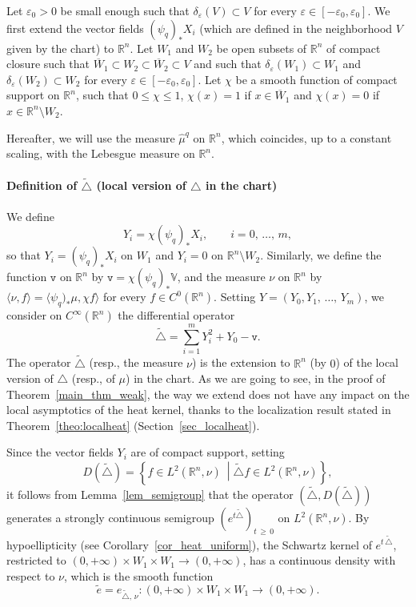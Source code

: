 \documentclass[AHL,Unicode,published]{cedram}
\newcommand*\R{\mathbb{R}}
\newcommand{\bbV}{\mathbb{V}}
\newcommand{\ttv}{\mathtt{v}}
\renewcommand{\geq}{\geqslant}
\renewcommand{\leq}{\leqslant}
\begin{document}
Let $\varepsilon_0>0$ be small enough such that $\delta_\varepsilon(V)\subset V$ for every $\varepsilon\in[-\varepsilon_0,\varepsilon_0]$. We first extend the vector fields $(\psi_{q})_*X_i$ (which are defined in the neighborhood $V$ given by the chart) to $\R^n$. Let $W_1$ and $W_2$ be open subsets of $\R^n$ of compact closure such that $\overline W_1\subset W_2\subset\overline W_2\subset V$ and such that $\delta_\varepsilon(W_1)\subset W_1$ and $\delta_\varepsilon(W_2)\subset W_2$ for every $\varepsilon\in[-\varepsilon_0,\varepsilon_0]$. Let $\chi$ be a smooth function of compact support on $\R^n$, such that $0\leq\chi\leq 1$, $\chi(x)=1$ if $x\in \overline W_1$ and $\chi(x)=0$ if $x\in\R^n\setminus W_2$.

Hereafter, we will use the measure $\widehat{\mu}^{q}$ on $\R^n$, which coincides, up to a constant scaling, with the Lebesgue measure on $\R^n$.


\goodbreak
\paragraph{Definition of $\widetilde\triangle$ (local version of $\triangle$ in the chart)}
We define
\[
Y_i = \chi (\psi_{q})_* X_i, \qquad i=0,\,\ldots,\,m,
\]
so that $Y_i = (\psi_{q})_* X_i$ on $W_1$ and $Y_i = 0$ on $\R^n\setminus W_2$. Similarly, we define the function $\ttv$ on $\R^n$ by $\ttv=\chi (\psi_{q})_* \bbV$, and the measure $\nu$ on $\R^n$ by $\langle\nu,f\rangle=\langle\psi_{q})_*\mu,\chi f\rangle$ for every $f\in C^0(\R^n)$. Setting $Y=(Y_0,Y_1,\,\ldots,\,Y_m)$, we consider on $C^\infty(\R^n)$ the differential operator
\begin{equation*}
\widetilde\triangle = \sum_{i=1}^m Y_i^2 + Y_0 - \ttv.
\end{equation*}
The operator $\widetilde\triangle$ (resp., the measure $\nu$) is the extension to $\R^n$ (by $0$) of the local version of $\triangle$ (resp., of $\mu$) in the chart. As we are going to see, in the proof of Theorem~\ref{main_thm_weak}, the way we extend does not have any impact on the local asymptotics of the heat kernel, thanks to the localization result stated in Theorem~\ref{theo:localheat} (Section~\ref{sec_localheat}).

Since the vector fields $Y_i$ are of compact support, setting
\[
D(\widetilde\triangle) = \left\{ f\in L^2(\R^n,\nu) \ \middle| \widetilde\triangle f \in L^2(\R^n,\nu) \right\},
\]
it follows from Lemma~\ref{lem_semigroup} that the operator $(\widetilde\triangle,D(\widetilde\triangle))$ generates a strongly continuous semigroup $(e^{t\widetilde\triangle})_{t\,\geq\,0}$ on $L^2(\R^n,\nu)$. By hypoellipticity (see Corollary~\ref{cor_heat_uniform}), the Schwartz kernel of $e^{t\,\widetilde\triangle}$, restricted to $(0,+\infty)\times W_1\times W_1\rightarrow(0,+\infty)$, has a continuous density with respect to $\nu$, which is the smooth function
\begin{equation*}
\widetilde e = e_{\widetilde\triangle,\,\nu}: (0,+\infty)\times W_1\times W_1\rightarrow(0,+\infty).
\end{equation*}
\end{document}
